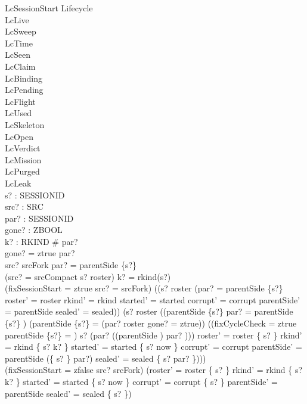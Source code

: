 \documentclass[a4paper,10pt,fleqn]{article}
\begin{document}
\begin{schema}{LcSessionStart}
\Delta Lifecycle \\
\Xi LcLive \\
\Xi LcSweep \\
\Xi LcTime \\
\Xi LcSeen \\
\Xi LcClaim \\
\Xi LcBinding \\
\Xi LcPending \\
\Xi LcFlight \\
\Xi LcUsed \\
\Xi LcSkeleton \\
\Xi LcOpen \\
\Xi LcVerdict \\
\Xi LcMission \\
\Xi LcPurged \\
\Xi LcLeak \\
s? : SESSIONID \\
src? : SRC \\
par? : \power SESSIONID \\
gone? : ZBOOL \\
k? : RKIND
\where
\# par?  \\
gone? = ztrue \implies par? \neq \emptyset \\
src? \neq srcFork \implies par? = parentSide \limg \{s?\} \rimg \\
(src? = srcCompact \land s? \in roster) \implies k? = rkind(s?) \\
(fixSessionStart = ztrue \lor src? = srcFork) \implies ((s? \in roster \implies (par? = parentSide \limg \{s?\} \rimg \land roster' = roster \land rkind' = rkind \land started' = started \land corrupt' = corrupt \land parentSide' = parentSide \land sealed' = sealed)) \land (s? \notin roster \implies ((parentSide \limg \{s?\} \rimg \neq \emptyset \implies par? = parentSide \limg \{s?\} \rimg) \land (parentSide \limg \{s?\} \rimg = \emptyset \implies (par? \subseteq roster \lor gone? = ztrue)) \land ((fixCycleCheck = ztrue \land parentSide \limg \{s?\} \rimg = \emptyset) \implies s? \notin (par? \cup ((parentSide \plus) \limg par? \rimg))) \land roster' = roster \cup \{ s? \} \land rkind' = rkind \oplus \{ s? \mapsto k? \} \land started' = started \oplus \{ s? \mapsto now \} \land corrupt' = corrupt \land parentSide' = parentSide \cup (\{ s? \} \cross par?) \land sealed' = sealed \oplus \{ s? \mapsto par? \}))) \\
(fixSessionStart = zfalse \land src? \neq srcFork) \implies (roster' = roster \cup \{ s? \} \land rkind' = rkind \oplus \{ s? \mapsto k? \} \land started' = started \oplus \{ s? \mapsto now \} \land corrupt' = corrupt \setminus \{ s? \} \land parentSide' = parentSide \land sealed' = sealed \oplus \{ s? \mapsto \emptyset \})
\end{schema}
\end{document}
